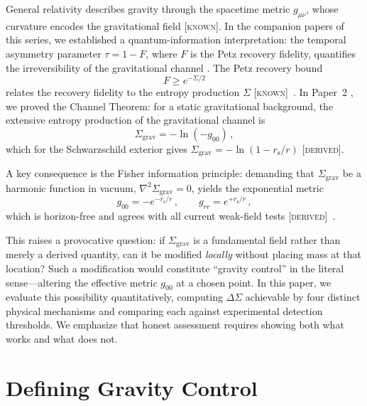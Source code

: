 \documentclass[prd,twocolumn,superscriptaddress,longbibliography,floatfix]{revtex4-2}
\newcommand{\tauasym}{\tau}
\newcommand{\Sgrav}{\Sigma_{\mathrm{grav}}}
\newcommand{\rs}{r_{\mathrm{s}}}
\newcommand{\DSigma}{\Delta\Sigma}
\newcommand{\known}{\textsc{[known]}}
\newcommand{\derived}{\textsc{[derived]}}
\begin{document}
General relativity describes gravity through the spacetime metric
$g_{\mu\nu}$, whose curvature encodes the gravitational field
\known.  In the companion papers of this series, we established a
quantum-information interpretation: the temporal asymmetry parameter
$\tauasym = 1 - F$, where $F$ is the Petz recovery fidelity, quantifies
the irreversibility of the gravitational channel
\cite{Huang2026paper1}.  The Petz recovery bound
\begin{equation}
  F \geq e^{-\Sigma/2}
  \label{eq:petz-bound}
\end{equation}
relates the recovery fidelity to the entropy production $\Sigma$
\known~\cite{Petz1986,Petz1988,Junge2018,Faulkner2022}.
In Paper~2 \cite{Huang2026paper2}, we proved the Channel Theorem:
for a static gravitational background, the extensive entropy
production of the gravitational channel is
\begin{equation}
  \Sgrav = -\ln(-g_{00}) \,,
  \label{eq:sigma-g00}
\end{equation}
which for the Schwarzschild exterior gives
$\Sgrav = -\ln(1 - \rs/r)$ \derived.

A key consequence is the Fisher information principle: demanding that
$\Sgrav$ be a harmonic function in vacuum,
$\nabla^2 \Sgrav = 0$, yields the exponential metric
\begin{equation}
  g_{00} = -e^{-\rs/r}\,, \qquad g_{rr} = e^{+\rs/r}\,,
  \label{eq:exp-metric}
\end{equation}
which is horizon-free and agrees with all current weak-field tests
\derived~\cite{Huang2026paper2}.

This raises a provocative question: if $\Sgrav$ is a fundamental
field rather than merely a derived quantity, can it be modified
\emph{locally} without placing mass at that location?  Such a
modification would constitute ``gravity control'' in the literal
sense---altering the effective metric $g_{00}$ at a chosen point.
In this paper, we evaluate this possibility quantitatively, computing
$\DSigma$ achievable by four distinct physical mechanisms and
comparing each against experimental detection thresholds.  We
emphasize that honest assessment requires showing both what works
and what does not.

\section{Defining Gravity Control}
\label{sec:definition}
\end{document}
